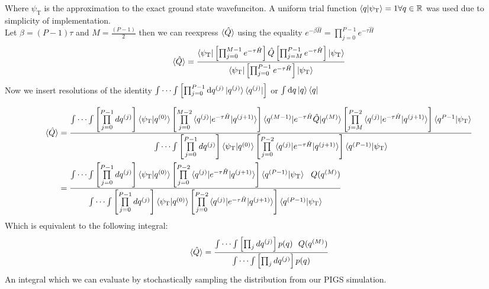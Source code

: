 \documentclass[12pt,letterpaper,oneside,final,titlepage]{article}               %
\numberwithin{equation}{section} %
\newcommand{\psiT}{\psi_{\textrm{T}}}
\newcommand{\eBH}{e^{-\beta\hat{H}}}
\newcommand{\eTH}{e^{-\tau\hat{H}}}
\begin{document}
Where $\psiT$ is the approximation to the exact ground state wavefunciton. 
A uniform trial function $\braket{q|\psiT} = 1 \forall q \in \mathbb{R} $ was used due to simplicity of implementation. \\
Let $\beta = (P-1)\tau$ and $M = \frac{(P-1)}{2}$ then we can reexpress $\braket{\hat{Q}}$ using the equality $\eBH = \prod_{j=0}^{P-1} \eTH$
\begin{align*}
    \braket{\hat{Q}} = \frac{\braket{\psiT|
                            \left[\prod_{j=0}^{M-1} \eTH\right]
                            \hat{Q}
                            \left[\prod_{j=M}^{P-1} \eTH\right]
                            |\psiT}}
                            {\braket{\psiT|\left[\prod_{j=0}^{P-1} \eTH\right]|\psiT}} 
\end{align*}
Now we insert resolutions of the identity
$\int\cdots\int\left[\prod_{j=0}^{P-1}\dif q^{(j)}\ket{q^{(j)}}\bra{q^{(j)}}\right]$ or
$\int \dif q\ket{q}\bra{q}$

\begin{align}
    \braket{\hat{Q}} 
        &=\frac{\int\cdots\int\left[\prod\limits_{j=0}^{P-1}dq^{(j)}\right]
                \braket{\psiT|q^{(0)}}
                \left[\prod\limits_{j=0}^{M-2}\braket{q^{(j)}|\eTH|q^{(j+1)}}\right]
                \braket{q^{(M-1)}|\eTH\hat{Q}|q^{(M)}}
                \left[\prod\limits_{j=M}^{P-2}\braket{q^{(j)}|\eTH|q^{(j+1)}}\right]
                \braket{q^{P-1}|\psiT}
                }
               {\int\cdots\int\left[\prod\limits_{j=0}^{P-1}dq^{(j)}\right]
                \braket{\psiT|q^{(0)}}
                \left[\prod\limits_{j=0}^{P-2}\braket{q^{(j)}|\eTH|q^{(j+1)}}\right]
                \braket{q^{(P-1)}|\psiT}
                }
    \\  &=\frac{\int\cdots\int\left[\prod\limits_{j=0}^{P-1}dq^{(j)}\right]
                \braket{\psiT|q^{(0)}}
                \left[\prod\limits_{j=0}^{P-2}\braket{q^{(j)}|\eTH|q^{(j+1)}}\right]
                \braket{q^{(P-1)}|\psiT}
                \,\,\,\,Q(q^{(M)})
                }
               {\int\cdots\int\left[\prod\limits_{j=0}^{P-1}dq^{(j)}\right]
                \braket{\psiT|q^{(0)}}
                \left[\prod\limits_{j=0}^{P-2}\braket{q^{(j)}|\eTH|q^{(j+1)}}\right]
                \braket{q^{(P-1)}|\psiT}
                }
\end{align}
Which is equivalent to the following integral:
\begin{equation}
\braket{\hat{Q}} 
                =\frac{\int\cdots\int\left[\prod_{j}dq^{(j)}\right]
                p(q)
                \,\,\,\,Q(q^{(M)})
                }
               {\int\cdots\int\left[\prod_{j}dq^{(j)}\right]
                p(q)
                } 
\end{equation}           
An integral which we can evaluate by stochastically sampling the distribution from our PIGS simulation.
\end{document}
